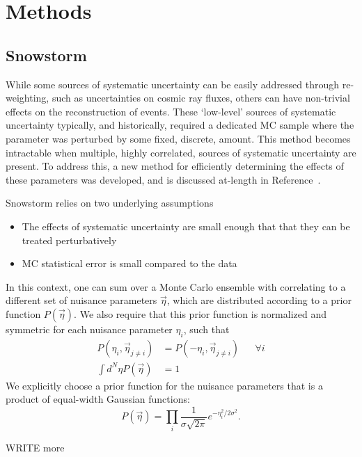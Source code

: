 \documentclass[main.tex]{subfiles}
\begin{document}
\section{Methods}
\subsection{Snowstorm}
While some sources of systematic uncertainty can be easily addressed through re-weighting, such as uncertainties on cosmic ray fluxes, others can have non-trivial effects on the reconstruction of events. 
These `low-level' sources of systematic uncertainty typically, and historically, required a dedicated MC sample where the parameter was perturbed by some fixed, discrete, amount. 
This method becomes intractable when multiple, highly correlated, sources of systematic uncertainty are present. 
To address this, a new method for efficiently determining the effects of these parameters was developed, and is discussed at-length in Reference~\cite{Aartsen_2019_snow}.

Snowstorm relies on two underlying assumptions
\begin{itemize}
    \item The effects of systematic uncertainty are small enough that that they can be treated perturbatively 
    \item MC statistical error is small compared to the data
\end{itemize}
In this context, one can sum over a Monte Carlo ensemble with correlating to a different set of nuisance parameters $\vec{\eta}$, which are distributed according to a prior function $P(\vec{\eta})$.
We also require that this prior function is normalized and symmetric for each nuisance parameter $\eta_{i}$, such that 
\begin{align}
    P(\eta_{i}, \vec{\eta}_{j\neq i}) &= P(-\eta_{i},\vec{\eta}_{j\neq i}) & &\forall i\\
    \int d^{N}\eta P(\vec{\eta}) &= 1
\end{align}
We explicitly choose a prior function for the nuisance parameters that is a product of equal-width Gaussian functions:
\begin{equation}
    P(\vec{\eta}) = \prod_{i} \dfrac{1}{\sigma \sqrt{2\pi}} e^{-\eta_{i}^{2}/2\sigma^{2}}.
\end{equation}

WRITE more
\end{document}
